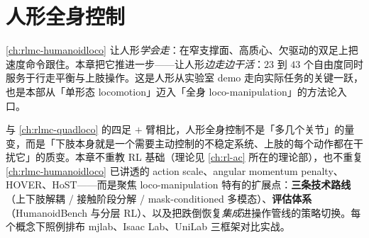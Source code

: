\chapter{人形全身控制}\label{ch:rlmc-humanoidwbc}


\cref{ch:rlmc-humanoidloco} 让人形\emph{学会走}：在窄支撑面、高质心、欠驱动的双足上把速度命令跟住。本章把它推进一步——让人形\emph{边走边干活}：$23$ 到 $43$ 个自由度同时服务于行走平衡与上肢操作。这是人形从实验室 demo 走向实际任务的关键一跃，也是本部从「单形态 locomotion」迈入「全身 loco-manipulation」的方法论入口。

与 \cref{ch:rlmc-quadloco} 的四足 $+$ 臂相比，人形全身控制不是「多几个关节」的量变，而是「下肢本身就是一个需要主动控制的不稳定系统、上肢的每个动作都在干扰它」的质变。本章不重教 RL 基础（理论见 \cref{ch:rl-ac} 所在的理论部），也不重复 \cref{ch:rlmc-humanoidloco} 已讲透的 action scale、angular momentum penalty、HOVER、HoST——而是聚焦 loco-manipulation 特有的扩展点：\textbf{三条技术路线}（上下肢解耦 / 接触阶段分解 / mask-conditioned 多模态）、\textbf{评估体系}（HumanoidBench 与分层 RL）、以及把跌倒恢复\emph{集成}进操作管线的策略切换。每个概念下照例排布 mjlab、Isaac Lab、UniLab 三框架对比实战。

